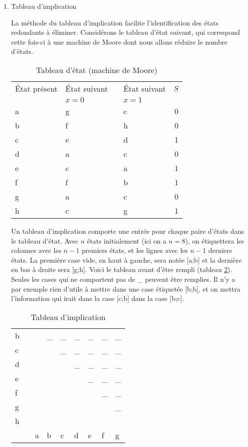 \documentclass[letter, oneside]{book}
\begin{document}
\begin{enumerate}
\item Tableau d'implication
\label{sec:orgc36ea34}

La méthode du tableau d'implication facilite l'identification des
états redondants à éliminer. Considérons le tableau d'état suivant,
qui correspond cette fois-ci à une machine de Moore dont nous allons
réduire le nombre d'états.

\begin{table}[htbp]
\caption{\label{tab:orgcb52abe}Tableau d'état (machine de Moore)}
\centering
\begin{tabular}{llllr}
État présent & État suivant &  & État suivant & \(S\)\\[0pt]
 & \(x=0\) &  & \(x=1\) & \\[0pt]
\hline
a & g &  & c & 0\\[0pt]
b & f &  & h & 0\\[0pt]
c & e &  & d & 1\\[0pt]
d & a &  & c & 0\\[0pt]
e & c &  & a & 1\\[0pt]
f & f &  & b & 1\\[0pt]
g & a &  & c & 0\\[0pt]
h & c &  & g & 1\\[0pt]
\end{tabular}
\end{table}

Un tableau d'implication comporte une entrée pour chaque paire d'états
dans le tableau d'état. Avec \(n\) états initialement (ici on a
\(n=8\)), on étiquettera les colonnes avec les \(n-1\) premiers états,
et les lignes avec les \(n-1\) derniers états. La première case vide,
en haut à gauche, sera notée [a;b] et la dernière en bas à droite sera
[g;h]. Voici le tableau avant d'être rempli (tableau
\ref{tab:orgcd7e6e3}). Seules les cases qui ne comportent pas de \_
peuvent être remplies. Il n'y a par exemple rien d'utile à mettre dans
une case étiquetée [b;b], et on mettra l'information qui irait dans la
case [c;b] dans la case [b;c].

\begin{table}[htbp]
\caption{\label{tab:orgcd7e6e3}Tableau d'implication}
\centering
\begin{tabular}{lllllllll}
b &  &  & \_ & \_ & \_ & \_ & \_ & \_\\[0pt]
c &  &  &  & \_ & \_ & \_ & \_ & \_\\[0pt]
d &  &  &  &  & \_ & \_ & \_ & \_\\[0pt]
e &  &  &  &  &  & \_ & \_ & \_\\[0pt]
f &  &  &  &  &  &  & \_ & \_\\[0pt]
g &  &  &  &  &  &  &  & \_\\[0pt]
h &  &  &  &  &  &  &  & \\[0pt]
\hline
 &  & a & b & c & d & e & f & g\\[0pt]
\end{tabular}
\end{table}


\end{enumerate}
\end{document}
